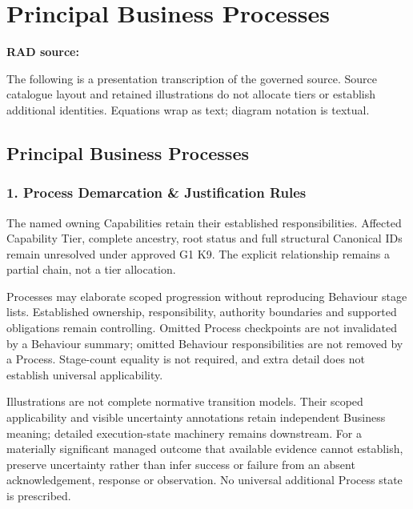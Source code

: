 \chapter{Principal Business Processes}\label{rad:processes}
\noindent\textbf{RAD source:} \texttt{}

The following is a presentation transcription of the governed source. Source catalogue layout and retained illustrations do not allocate tiers or establish additional identities. Equations wrap as text; diagram notation is textual.

\label{rad:processes:1}
\section*{Principal Business Processes}
\label{rad:processes:3}
\subsection*{1. Process Demarcation \& Justification Rules}
\label{rad:processes:5}

The named owning Capabilities retain their established responsibilities. Affected Capability Tier, complete ancestry, root status and full structural Canonical IDs remain unresolved under approved G1 K9. The explicit \texttt{} relationship remains a partial chain, not a tier allocation.

\label{rad:processes:7}

Processes may elaborate scoped progression without reproducing Behaviour stage lists. Established ownership, responsibility, authority boundaries and supported obligations remain controlling. Omitted Process checkpoints are not invalidated by a Behaviour summary; omitted Behaviour responsibilities are not removed by a Process. Stage-count equality is not required, and extra detail does not establish universal applicability.

\label{rad:processes:9}

Illustrations are not complete normative transition models. Their scoped applicability and visible uncertainty annotations retain independent Business meaning; detailed execution-state machinery remains downstream. For a materially significant managed outcome that available evidence cannot establish, preserve uncertainty rather than infer success or failure from an absent acknowledgement, response or observation. No universal additional Process state is prescribed.

